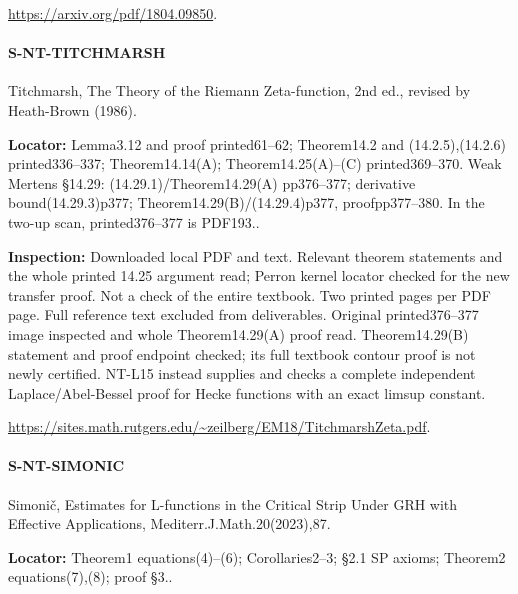\documentclass[11pt,a4paper]{article}
\begin{document}
\url{https://arxiv.org/pdf/1804.09850}.

\paragraph{S-NT-TITCHMARSH} Titchmarsh, The Theory of the Riemann Zeta-function, 2nd ed.\allowbreak{}, revised by Heath-Brown (1986).

\textbf{Locator:} Lemma3.\allowbreak{}12 and proof printed61–\allowbreak{}62; Theorem14.\allowbreak{}2 and (14.\allowbreak{}2.\allowbreak{}5),(14.\allowbreak{}2.\allowbreak{}6) printed336–\allowbreak{}337; Theorem14.\allowbreak{}14(A); Theorem14.\allowbreak{}25(A)–\allowbreak{}(C) printed369–\allowbreak{}370.\allowbreak{} Weak Mertens §14.\allowbreak{}29:\allowbreak{} (14.\allowbreak{}29.\allowbreak{}1)/\allowbreak{}Theorem14.\allowbreak{}29(A) pp376–\allowbreak{}377; derivative bound(14.\allowbreak{}29.\allowbreak{}3)p377; Theorem14.\allowbreak{}29(B)/\allowbreak{}(14.\allowbreak{}29.\allowbreak{}4)p377, proofpp377–\allowbreak{}380.\allowbreak{} In the two-up scan, printed376–\allowbreak{}377 is PDF193.\allowbreak{}.

\textbf{Inspection:} Downloaded local PDF and text.\allowbreak{} Relevant theorem statements and the whole printed 14.\allowbreak{}25 argument read; Perron kernel locator checked for the new transfer proof.\allowbreak{} Not a check of the entire textbook.\allowbreak{} Two printed pages per PDF page.\allowbreak{} Full reference text excluded from deliverables.\allowbreak{} Original printed376–\allowbreak{}377 image inspected and whole Theorem14.\allowbreak{}29(A) proof read.\allowbreak{} Theorem14.\allowbreak{}29(B) statement and proof endpoint checked; its full textbook contour proof is not newly certified.\allowbreak{} NT-L15 instead supplies and checks a complete independent Laplace/\allowbreak{}Abel-Bessel proof for Hecke functions with an exact limsup constant.\allowbreak{}

\url{https://sites.math.rutgers.edu/~zeilberg/EM18/TitchmarshZeta.pdf}.

\paragraph{S-NT-SIMONIC} Simonič, Estimates for L-functions in the Critical Strip Under GRH with Effective Applications, Mediterr.\allowbreak{}J.\allowbreak{}Math.\allowbreak{}20(2023),87.

\textbf{Locator:} Theorem1 equations(4)–\allowbreak{}(6); Corollaries2–\allowbreak{}3; §2.\allowbreak{}1 SP axioms; Theorem2 equations(7),(8); proof §3.\allowbreak{}.
\end{document}
